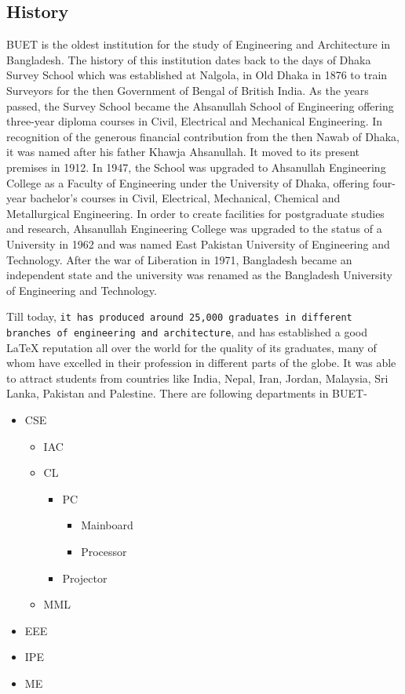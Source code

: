 \documentclass[a4paper,12pt,oneside]{article}
\begin{document}
\subsection*{History}	
BUET is the oldest institution for the study of Engineering and Architecture in Bangladesh. The history of this institution dates back to the days of Dhaka Survey School which was established at Nalgola, in Old Dhaka in 1876 to train Surveyors for the then Government of Bengal of British India. As the years passed, the Survey School became the Ahsanullah School of Engineering offering three-year diploma courses in Civil, Electrical and Mechanical Engineering. In recognition of the generous financial contribution from the then Nawab of Dhaka, it was named after his father Khawja Ahsanullah. It moved to its present premises in 1912. In 1947, the School was upgraded to Ahsanullah Engineering College as a Faculty of Engineering under the University of Dhaka, offering four-year bachelor’s courses in Civil, Electrical, Mechanical, Chemical and Metallurgical Engineering. In order to create facilities for postgraduate studies and research, Ahsanullah Engineering College was upgraded to the status of a University in 1962 and was named East Pakistan University of Engineering and Technology. After the war of Liberation in 1971, Bangladesh became an independent state and the university was renamed as the Bangladesh University of Engineering and Technology.
	
Till today, \texttt{it has produced around 25,000 graduates in different branches of engineering and architecture}, and has established a good \LaTeX{} reputation all over the world for the quality of its graduates, many of whom have excelled in their profession in different parts of the globe. It was able to attract students from countries like India, Nepal, \tiny Iran, \Huge Jordan, \normalsize Malaysia, Sri Lanka, Pakistan and Palestine.
There are following departments in BUET- 
\begin{itemize}
\item CSE
	\begin{itemize}
		\item IAC
		\item CL
			\begin{itemize}
				\item PC
					\begin{itemize}
						\item Mainboard
						\item Processor
					\end{itemize}
				\item Projector
			\end{itemize}
		\item MML
	\end{itemize}
\item EEE 
\item IPE
\item ME
\end{itemize}
\end{document}
